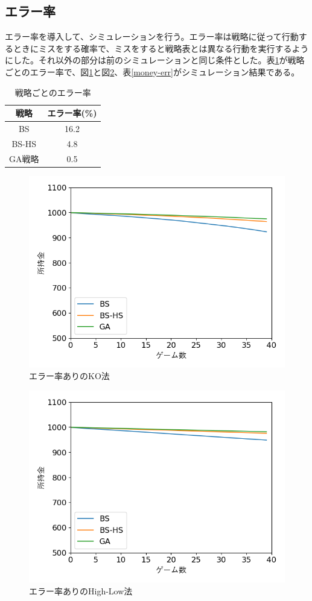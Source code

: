 \subsection{エラー率}
エラー率を導入して、シミュレーションを行う。エラー率は戦略に従って行動するときにミスをする確率で、ミスをすると戦略表とは異なる行動を実行するようにした。それ以外の部分は前のシミュレーションと同じ条件とした。表\ref{err}が戦略ごとのエラー率で、図\ref{errKO}と図\ref{errHi-Lo}、表\ref{money-err}がシミュレーション結果である。
\begin{table}[H]
 \caption{戦略ごとのエラー率\label{err}}
 \begin{center}
  \begin{tabular}{|c|c|}
  \hline 戦略 & エラー率(\%) \\
  \hline BS & 16.2\\
  \hline BS-HS & 4.8 \\
  \hline GA戦略 & 0.5\\
  \hline
  \end{tabular}
 \end{center}
\end{table}

\begin{figure}[H]
 \begin{center} 
  \includegraphics[width=0.7\linewidth]{./figure/errKO}
  \caption{エラー率ありのKO法\label{errKO}}
 \end{center}
\end{figure}

\begin{figure}[H]
 \begin{center} 
  \includegraphics[width=0.7\linewidth]{./figure/errHi-Lo}
  \caption{エラー率ありのHigh-Low法\label{errHi-Lo}}
 \end{center}
\end{figure}

